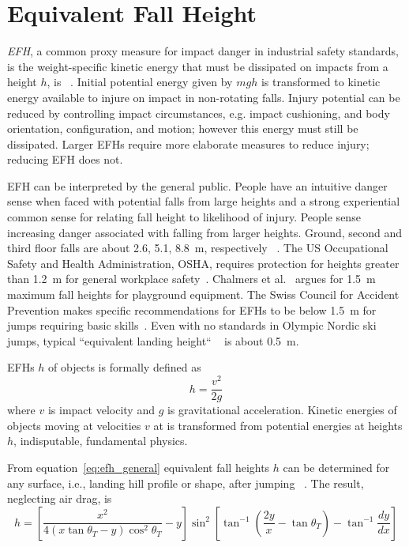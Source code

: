 \documentclass[smallextended]{svjour3}       %
\begin{document}
\section{Equivalent Fall Height}
\label{sec:efh}
%
\emph{EFH}, a common proxy measure for impact danger in industrial safety
standards, is the weight-specific kinetic energy that must be dissipated on
impacts from a height $h$, is ~\cite{Hubbard2012}.  Initial potential energy given
by $mgh$ is transformed to kinetic energy available to injure on impact in
non-rotating falls. Injury potential can be reduced by controlling impact
circumstances, e.g.  impact cushioning, and body orientation, configuration,
and motion; however this energy must still be dissipated. Larger EFHs require
more elaborate measures to reduce injury; reducing EFH does not.

EFH can be interpreted by the general public. People have an intuitive danger
sense when faced with potential falls from large heights and a strong
experiential common sense for relating fall height to likelihood of injury.
People sense increasing danger associated with falling from larger heights.
Ground, second and third floor falls are about 2.6, 5.1,
8.8~\si{\meter}, respectively ~\cite{Vish2005}. The US Occupational Safety and Health
Administration, OSHA, requires protection for heights greater than
1.2~\si{\meter} for general workplace safety~\cite{OSHA2021}.  Chalmers et
al.~\cite{Chalmers1996} argues for 1.5~\si{\meter} maximum fall heights for
playground equipment. The Swiss Council for Accident Prevention makes specific
recommendations for EFHs to be below 1.5~\si{\meter} for jumps requiring basic
skills~\cite{Heer2019}. Even with no standards in Olympic Nordic ski jumps, typical 
``equivalent landing height``  ~\cite{Gasser2018} is about 0.5~\si{\meter}.

EFHs $h$ of objects is formally defined as
%
\begin{equation} h = \frac{v^2}{2g} \label{eq:efh_general} \end{equation}
%
where $v$ is impact velocity and $g$ is gravitational acceleration.
Kinetic energies of objects moving at  velocities $v$ at  is transformed from potential energies at heights $h$, indisputable, fundamental physics.

From equation~\ref{eq:efh_general} equivalent fall heights $h$ can be
determined for any surface, i.e., landing hill profile or shape, after jumping
~\cite{Petrone2017}. The result, neglecting air drag, is
%
\begin{equation}
  h = \left[\frac{x^2}{4(x\tan\theta_T - y)\cos^{2}\theta_T} -
    y\right]\sin^{2}\left[\tan^{-1}\left(\frac{2y}{x}- \tan\theta_T\right) -
    \tan^{-1}\frac{dy}{dx}\right]
  \label{eq:efh}
\end{equation}
\end{document}
